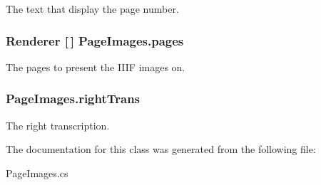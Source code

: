 The text that display the page number. 

\subsubsection[{pages}]{\setlength{\rightskip}{0pt plus 5cm}Renderer [$\,$] Page\+Images.\+pages}\label{class_page_images_ab33e023afe9968299aee2c600a9b6670}


The pages to present the I\+I\+IF images on. 

\subsubsection[{right\+Trans}]{ Page\+Images.\+right\+Trans}\label{class_page_images_a43dd571101b0554c29a48c8fab263042}


The right transcription. 



The documentation for this class was generated from the following file\+:\begin{DoxyCompactItemize}
\item 
Page\+Images.\+cs\end{DoxyCompactItemize}
